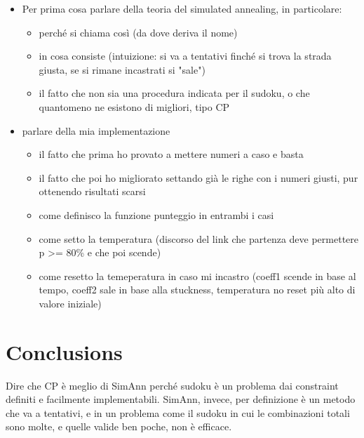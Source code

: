 \begin{itemize}
    \item Per prima cosa parlare della teoria del simulated annealing, in particolare:
    \begin{itemize}
        \item perché si chiama così (da dove deriva il nome)
        \item in cosa consiste (intuizione: si va a tentativi finché si trova la strada giusta, se si rimane incastrati si "sale")
        \item il fatto che non sia una procedura indicata per il sudoku, o che quantomeno ne esistono di migliori, tipo CP
    \end{itemize}
    \item parlare della mia implementazione
    \begin{itemize}
        \item il fatto che prima ho provato a mettere numeri a caso e basta
        \item il fatto che poi ho migliorato settando già le righe con i numeri giusti, pur ottenendo risultati scarsi
        \item come definisco la funzione punteggio in entrambi i casi
        \item come setto la temperatura (discorso del link che partenza deve permettere p >= 80\% e che poi scende)
        \item come resetto la temeperatura in caso mi incastro (coeff1 scende in base al tempo, coeff2 sale in base alla stuckness, temperatura no reset più alto di valore iniziale)
    \end{itemize}
\end{itemize}

\section{Conclusions}

Dire che CP è meglio di SimAnn perché sudoku è un problema dai constraint definiti e facilmente implementabili.
SimAnn, invece, per definizione è un metodo che va a tentativi, e in un problema come il sudoku in cui le combinazioni totali
sono molte, e quelle valide ben poche, non è efficace.